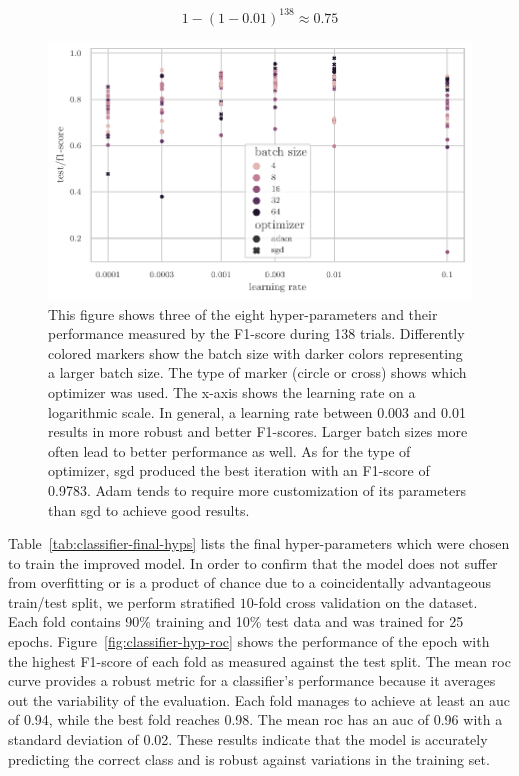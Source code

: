 \documentclass[draft,final]{vutinfth} %
\begin{document}
\begin{equation}\label{eq:opt-prob}
  1 - (1 - 0.01)^{138} \approx 0.75
\end{equation}

\begin{figure}
  \centering
  \includegraphics{graphics/classifier-hyp-metrics.pdf}
  \caption[Classifier hyper-parameter optimization results.]{This
    figure shows three of the eight hyper-parameters and their
    performance measured by the F1-score during 138
    trials. Differently colored markers show the batch size with
    darker colors representing a larger batch size. The type of marker
    (circle or cross) shows which optimizer was used. The x-axis shows
    the learning rate on a logarithmic scale. In general, a learning
    rate between 0.003 and 0.01 results in more robust and better
    F1-scores. Larger batch sizes more often lead to better
    performance as well. As for the type of optimizer, \gls{sgd}
    produced the best iteration with an F1-score of 0.9783. Adam tends
    to require more customization of its parameters than \gls{sgd} to
    achieve good results.}
  \label{fig:classifier-hyp-results}
\end{figure}

Table~\ref{tab:classifier-final-hyps} lists the final hyper-parameters
which were chosen to train the improved model. In order to confirm
that the model does not suffer from overfitting or is a product of
chance due to a coincidentally advantageous train/test split, we
perform stratified $10$-fold cross validation on the dataset. Each
fold contains 90\% training and 10\% test data and was trained for 25
epochs. Figure~\ref{fig:classifier-hyp-roc} shows the performance of
the epoch with the highest F1-score of each fold as measured against
the test split. The mean \gls{roc} curve provides a robust metric for
a classifier's performance because it averages out the variability of
the evaluation. Each fold manages to achieve at least an \gls{auc} of
0.94, while the best fold reaches 0.98. The mean \gls{roc} has an
\gls{auc} of 0.96 with a standard deviation of 0.02. These results
indicate that the model is accurately predicting the correct class and
is robust against variations in the training set.
\end{document}
